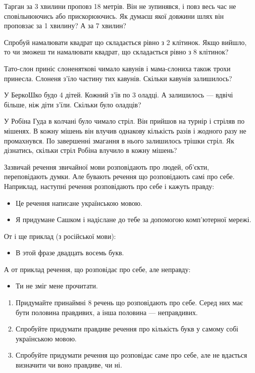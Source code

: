 \problem
Тарган за 3 хвилини проповз 18 метрів.
Він не зупинявся, і повз весь час не сповільнюючись або прискорюючись.
Як думаєш якої довжини шлях він проповзає за 1 хвилину?
А за 7 хвилин?


\problem
Спробуй намалювати квадрат що складається рівно з 2 клітинок.
Якщо вийшло, то чи зможеш ти намалювати квадрат,
що складається рівно з 8 клітинок?


\problem
Тато-слон приніс слоненяткові чимало кавунів
і мама-слониха також трохи принесла.
Слоненя з’їло частину тих кавунів.
Скільки кавунів залишилось?


\problem
У БеркоШко будо 4 дітей. Кожний з’їв по 3 оладці.
А залишилось --- вдвічі більше, ніж діти з’їли.
Скільки було оладців?


\problem
У Робіна Гуда в колчані було чимало стріл.
Він прийшов на турнір і стріляв по мішенях.
В кожну мішень він влучив однакову кількість разів
і жодного разу не промахнувся.
По завершенні змагання в нього залишилось трішки стріл.
Як дізнатись, скільки стріл Робіна влучило в кожну мішень?


\problem
Зазвичай речення звичайної мови розповідають про людей, об'єкти,
переповідають думки.
Але бувають речення що розповідають самі про себе.
Наприклад, наступні речення розповідають про себе і кажуть правду:
\begin{itemize}
    \item Це речення написане українською мовою.
    \item Я придумане Сашком і надіслане до тебе
    за допомогою комп’ютерної мережі.
\end{itemize}
От і ще приклад (з російської мови):
\begin{itemize}
    \item В этой фразе двадцать восемь букв.
\end{itemize}
А от приклад речення, що розповідає про себе, але неправду:
\begin{itemize}
    \item Ти не зміг мене прочитати.
\end{itemize}

\begin{enumerate}
    \item Придумайте принаймні 8 речень що розповідають про себе.
    Серед них має бути половина правдивих, а інша половина --- неправдивих.
    \item Спробуйте придумати правдиве речення про кількість букв
    у самому собі українською мовою. 
    \item Спробуйте придумати речення що розповідає саме про себе,
    але не вдається визначити чи воно правдиве, чи ні.
\end{enumerate}


